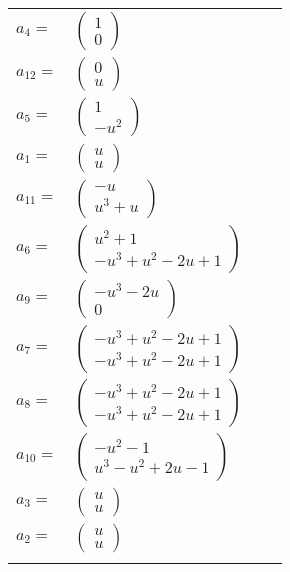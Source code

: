 \documentclass[1p]{elsarticle_modified}
\theoremstyle{definition}
\begin{document}
\begin{tabular}{m{7pt} m{180pt} m{7pt} m{180pt} }
\flushright $a_{4}=$&$\begin{pmatrix}1\\0\end{pmatrix}$ \\
\flushright $a_{12}=$&$\begin{pmatrix}0\\u\end{pmatrix}$ \\
\flushright $a_{5}=$&$\begin{pmatrix}1\\- u^2\end{pmatrix}$ \\
\flushright $a_{1}=$&$\begin{pmatrix}u\\u\end{pmatrix}$ \\
\flushright $a_{11}=$&$\begin{pmatrix}- u\\u^3+u\end{pmatrix}$ \\
\flushright $a_{6}=$&$\begin{pmatrix}u^2+1\\- u^3+u^2-2 u+1\end{pmatrix}$ \\
\flushright $a_{9}=$&$\begin{pmatrix}- u^3-2 u\\0\end{pmatrix}$ \\
\flushright $a_{7}=$&$\begin{pmatrix}- u^3+u^2-2 u+1\\- u^3+u^2-2 u+1\end{pmatrix}$ \\
\flushright $a_{8}=$&$\begin{pmatrix}- u^3+u^2-2 u+1\\- u^3+u^2-2 u+1\end{pmatrix}$ \\
\flushright $a_{10}=$&$\begin{pmatrix}- u^2-1\\u^3- u^2+2 u-1\end{pmatrix}$ \\
\flushright $a_{3}=$&$\begin{pmatrix}u\\u\end{pmatrix}$ \\
\flushright $a_{2}=$&$\begin{pmatrix}u\\u\end{pmatrix}$\\&\end{tabular}
\end{document}

